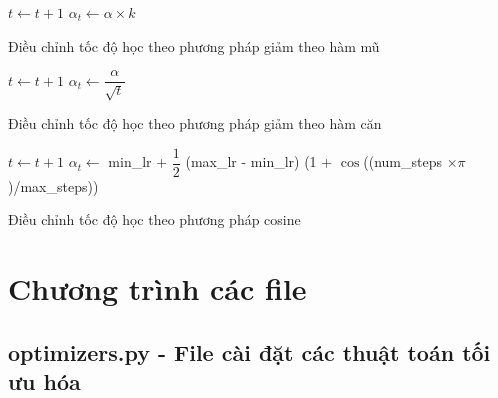 \documentclass[14pt, a4paper]{article}
\theoremstyle{sltheorem}
\theoremstyle{soltheorem}
\begin{document}
\begin{algorithm}[h!]
    \DontPrintSemicolon
     {
        $t \gets t + 1$\;
         {
            $\alpha_t \gets \alpha \times k$\;
        } 
    }
    \caption{Điều chỉnh tốc độ học theo phương pháp giảm theo hàm mũ}
\end{algorithm}

\begin{algorithm}[h!]
    \DontPrintSemicolon
     {
        $t \gets t + 1$\;
        $\alpha_t \gets \dfrac{\alpha}{\sqrt{t}}$\;
    }
    \caption{Điều chỉnh tốc độ học theo phương pháp giảm theo hàm căn}
\end{algorithm}


\begin{algorithm}[h!]
    \DontPrintSemicolon
     {
        $t \gets t + 1$\;
        $\alpha_t \gets$ min\_lr + $\dfrac{1}{2}$ (max\_lr - min\_lr) (1 + $\cos$((num\_steps $\times \pi$)/max\_steps))\;
    }
    \caption{Điều chỉnh tốc độ học theo phương pháp cosine}
\end{algorithm}

\newpage
\section{Chương trình các file}

\subsection{optimizers.py - File cài đặt các thuật toán tối ưu hóa}
\end{document}
